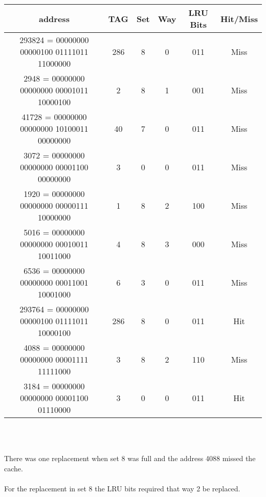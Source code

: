 \documentclass[11pt,reqno]{article}
\begin{document}
\begin{tabular}{| c | c | c | c | c | c |}
\hline
address & TAG & Set & Way & LRU Bits & Hit/Miss \\ \hline
293824 = 00000000 00000100 01111011 11000000 & 286 & 8 & 0 & 011 & Miss \\ \hline
\hspace{11pt}2948 = 00000000 00000000 00001011 10000100 & 2 & 8 & 1 & 001 & Miss \\ \hline
\hspace{5pt}41728 = 00000000 00000000 10100011 00000000 & 40 & 7 & 0 & 011 & Miss\\ \hline
\hspace{11pt}3072 = 00000000 00000000 00001100 00000000 & 3 & 0 & 0 & 011 & Miss\\ \hline
\hspace{11pt}1920 = 00000000 00000000 00000111 10000000 & 1 & 8 & 2 & 100 & Miss \\ \hline
\hspace{11pt}5016 = 00000000 00000000 00010011 10011000 & 4 & 8 & 3 & 000 & Miss \\ \hline
\hspace{11pt}6536 = 00000000 00000000 00011001 10001000 & 6 & 3 & 0 & 011 & Miss \\ \hline
293764 = 00000000 00000100 01111011 10000100 & 286 & 8 & 0 & 011 & Hit \\ \hline
\hspace{11pt}4088 = 00000000 00000000 00001111 11111000 & 3 & 8 & 2 & 110 & Miss \\ \hline
\hspace{11pt}3184 = 00000000 00000000 00001100 01110000 & 3 & 0 & 0 & 011 & Hit \\ \hline
\end{tabular}\\
\vspace{10pt}

\noindent{}\\ 

There was one replacement when set 8 was full and the address 4088 missed the cache.\\

\noindent{}\\ 

For the replacement in set 8 the LRU bits required that way 2 be replaced.\\

\noindent{}\\ 
\end{document}
